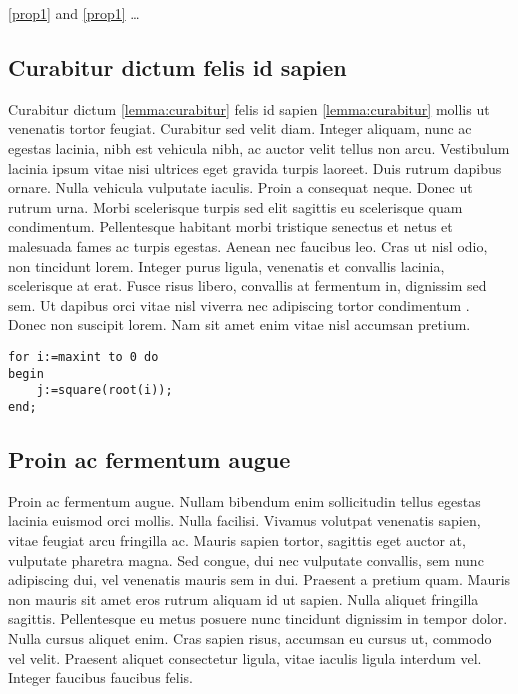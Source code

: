 \documentclass[a4paper,UKenglish,cleveref, autoref]{lipics-v2019}
\begin{document}
\autoref{prop1} and \cref{prop1} \ldots

\subsection{Curabitur dictum felis id sapien}

Curabitur dictum \cref{lemma:curabitur} felis id sapien \autoref{lemma:curabitur} mollis ut venenatis tortor feugiat. Curabitur sed velit diam. Integer aliquam, nunc ac egestas lacinia, nibh est vehicula nibh, ac auctor velit tellus non arcu. Vestibulum lacinia ipsum vitae nisi ultrices eget gravida turpis laoreet. Duis rutrum dapibus ornare. Nulla vehicula vulputate iaculis. Proin a consequat neque. Donec ut rutrum urna. Morbi scelerisque turpis sed elit sagittis eu scelerisque quam condimentum. Pellentesque habitant morbi tristique senectus et netus et malesuada fames ac turpis egestas. Aenean nec faucibus leo. Cras ut nisl odio, non tincidunt lorem. Integer purus ligula, venenatis et convallis lacinia, scelerisque at erat. Fusce risus libero, convallis at fermentum in, dignissim sed sem. Ut dapibus orci vitae nisl viverra nec adipiscing tortor condimentum \cite{DBLP:journals/cacm/Dijkstra68a}. Donec non suscipit lorem. Nam sit amet enim vitae nisl accumsan pretium. 

\begin{lstlisting}[caption={Useless code},label=list:8-6,captionpos=t,float,abovecaptionskip=-\medskipamount]
for i:=maxint to 0 do 
begin 
    j:=square(root(i));
end;
\end{lstlisting}

\subsection{Proin ac fermentum augue}

Proin ac fermentum augue. Nullam bibendum enim sollicitudin tellus egestas lacinia euismod orci mollis. Nulla facilisi. Vivamus volutpat venenatis sapien, vitae feugiat arcu fringilla ac. Mauris sapien tortor, sagittis eget auctor at, vulputate pharetra magna. Sed congue, dui nec vulputate convallis, sem nunc adipiscing dui, vel venenatis mauris sem in dui. Praesent a pretium quam. Mauris non mauris sit amet eros rutrum aliquam id ut sapien. Nulla aliquet fringilla sagittis. Pellentesque eu metus posuere nunc tincidunt dignissim in tempor dolor. Nulla cursus aliquet enim. Cras sapien risus, accumsan eu cursus ut, commodo vel velit. Praesent aliquet consectetur ligula, vitae iaculis ligula interdum vel. Integer faucibus faucibus felis. 
\end{document}
